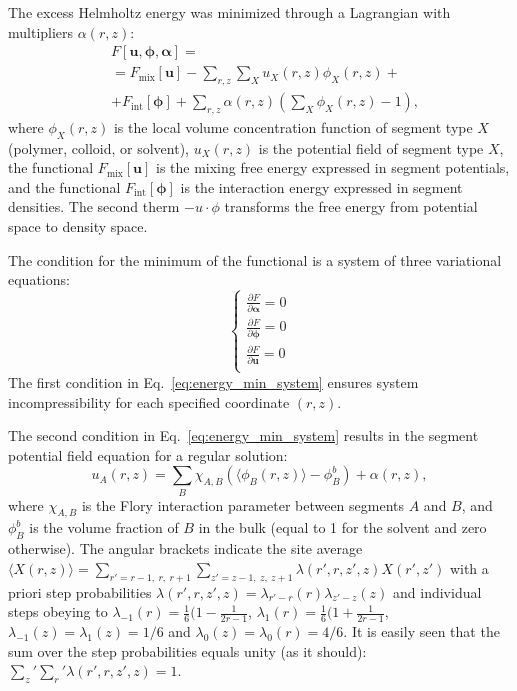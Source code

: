 \documentclass[10pt, a4paper, twocolumn]{article}
\begin{document}
The excess Helmholtz energy was minimized through a Lagrangian with multipliers $\alpha(r,z)$:
\begin{equation}
    \label{eq:fe_lagrangian}
    \begin{aligned}
        &F[\bm{u}, \boldsymbol{\phi}, \boldsymbol{\alpha}] =\\
        &= F_{\text{mix}}[\bm{u}] - \sum\limits_{r,z} \sum\limits_X u_X(r, z) \phi_X(r, z) + \\
        &+ F_{\text{int}} [\boldsymbol{\phi}] 
        + \sum\limits_{r,z} \alpha(r, z) \left( \sum\limits_X \phi_X(r, z) - 1 \right),
    \end{aligned} 
\end{equation}
where $\phi_X(r,z)$ is the local volume concentration function of segment type $X$ (polymer, colloid, or solvent), $u_X(r, z)$ is the potential field of segment type $X$, the functional $F_{\text{mix}}[\bm{u}]$ is the mixing free energy expressed in segment potentials, and the functional $F_{\text{int}} [\boldsymbol{\phi}]$ is the interaction energy expressed in  segment densities.
The second therm $- u\cdot \phi$ transforms the free energy from potential space to density space.

The condition for the minimum of the functional is a system of three variational equations:
\begin{equation}
    \label{eq:energy_min_system}
    \begin{cases}
        \frac{\partial F}{\partial \boldsymbol{\alpha}} = 0 \\
        \frac{\partial F}{\partial \boldsymbol{\phi}} = 0 \\
        \frac{\partial F}{\partial \bm{u}} = 0 \\
    \end{cases}
\end{equation}
The first condition in Eq.~\eqref{eq:energy_min_system} ensures system incompressibility for each specified coordinate $(r,z)$.

The second condition in Eq.~\eqref{eq:energy_min_system} results in the segment potential field equation for a regular solution:
\begin{equation}
    \label{eq:u-phi}
    u_A(r, z) =\sum\limits_{B} \chi_{A,B} \left(\langle \phi_B(r,z)\rangle - \phi_B^b \right) + \alpha(r, z),
\end{equation}
where $\chi_{A,B}$ is the Flory interaction parameter between segments $A$ and $B$, and $\phi_B^b$ is the volume fraction of $B$ in the bulk (equal to 1 for the solvent and zero otherwise).
The angular brackets indicate the site average $\langle X(r,z)\rangle = \sum_{r'=r-1,\ r,\ r+1}\sum_{z'=z-1,\ z,\ z+1} \lambda(r',r,z',z) X(r',z')$ with a priori step probabilities $\lambda(r',r,z',z)=\lambda_{r'-r}(r) \lambda_{z'-z}(z) $ and individual steps obeying to $\lambda_{-1}(r)=\frac{1}{6}(1-\frac{1}{2r-1}$, $\lambda_1 (r)=\frac{1}{6}(1+\frac{1}{2r-1}$, $\lambda_{-1}(z)=\lambda_1(z)=1/6$ and $\lambda_0(z)=\lambda_0(r)=4/6$.
It is easily seen that the sum over the step probabilities equals unity (as it should): $\sum_z'\sum_r' \lambda(r',r,z',z) = 1$.
\end{document}
